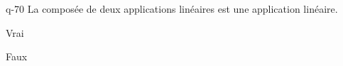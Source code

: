 \begin{truefalse}{q-70}
La composée de deux applications linéaires est une application linéaire.
\item* Vrai
\item Faux
\end{truefalse}

